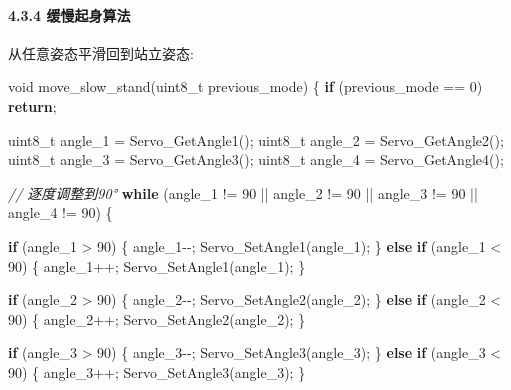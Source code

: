 \documentclass[
]{article}
\newenvironment{Shaded}{}{}
\newcommand{\CharTok}[1]{\textcolor[rgb]{0.25,0.44,0.63}{#1}}
\newcommand{\CommentTok}[1]{\textcolor[rgb]{0.38,0.63,0.69}{\textit{#1}}}
\newcommand{\ControlFlowTok}[1]{\textcolor[rgb]{0.00,0.44,0.13}{\textbf{#1}}}
\newcommand{\DataTypeTok}[1]{\textcolor[rgb]{0.56,0.13,0.00}{#1}}
\newcommand{\DecValTok}[1]{\textcolor[rgb]{0.25,0.63,0.44}{#1}}
\newcommand{\NormalTok}[1]{#1}
\begin{document}
\hypertarget{ux7f13ux6162ux8d77ux8eabux7b97ux6cd5}{%
\paragraph{4.3.4
缓慢起身算法}\label{ux7f13ux6162ux8d77ux8eabux7b97ux6cd5}}

从任意姿态平滑回到站立姿态:

\begin{Shaded}
\begin{Highlighting}[]
\DataTypeTok{void}\NormalTok{ move\_slow\_stand(}\DataTypeTok{uint8\_t}\NormalTok{ previous\_mode)}
\NormalTok{\{}
    \ControlFlowTok{if}\NormalTok{ (previous\_mode == }\CharTok{\textquotesingle{}0\textquotesingle{}}\NormalTok{) }\ControlFlowTok{return}\NormalTok{;}
    
    \DataTypeTok{uint8\_t}\NormalTok{ angle\_1 = Servo\_GetAngle1();}
    \DataTypeTok{uint8\_t}\NormalTok{ angle\_2 = Servo\_GetAngle2();}
    \DataTypeTok{uint8\_t}\NormalTok{ angle\_3 = Servo\_GetAngle3();}
    \DataTypeTok{uint8\_t}\NormalTok{ angle\_4 = Servo\_GetAngle4();}
    
    \CommentTok{// 逐度调整到90°}
    \ControlFlowTok{while}\NormalTok{ (angle\_1 != }\DecValTok{90}\NormalTok{ || angle\_2 != }\DecValTok{90}\NormalTok{ || }
\NormalTok{           angle\_3 != }\DecValTok{90}\NormalTok{ || angle\_4 != }\DecValTok{90}\NormalTok{) \{}
        
        \ControlFlowTok{if}\NormalTok{ (angle\_1 \textgreater{} }\DecValTok{90}\NormalTok{) \{}
\NormalTok{            angle\_1{-}{-};}
\NormalTok{            Servo\_SetAngle1(angle\_1);}
\NormalTok{        \} }\ControlFlowTok{else} \ControlFlowTok{if}\NormalTok{ (angle\_1 \textless{} }\DecValTok{90}\NormalTok{) \{}
\NormalTok{            angle\_1++;}
\NormalTok{            Servo\_SetAngle1(angle\_1);}
\NormalTok{        \}}
        
        \ControlFlowTok{if}\NormalTok{ (angle\_2 \textgreater{} }\DecValTok{90}\NormalTok{) \{}
\NormalTok{            angle\_2{-}{-};}
\NormalTok{            Servo\_SetAngle2(angle\_2);}
\NormalTok{        \} }\ControlFlowTok{else} \ControlFlowTok{if}\NormalTok{ (angle\_2 \textless{} }\DecValTok{90}\NormalTok{) \{}
\NormalTok{            angle\_2++;}
\NormalTok{            Servo\_SetAngle2(angle\_2);}
\NormalTok{        \}}
        
        \ControlFlowTok{if}\NormalTok{ (angle\_3 \textgreater{} }\DecValTok{90}\NormalTok{) \{}
\NormalTok{            angle\_3{-}{-};}
\NormalTok{            Servo\_SetAngle3(angle\_3);}
\NormalTok{        \} }\ControlFlowTok{else} \ControlFlowTok{if}\NormalTok{ (angle\_3 \textless{} }\DecValTok{90}\NormalTok{) \{}
\NormalTok{            angle\_3++;}
\NormalTok{            Servo\_SetAngle3(angle\_3);}
\NormalTok{        \}}
        

\end{Highlighting}
\end{Shaded}
\end{document}
